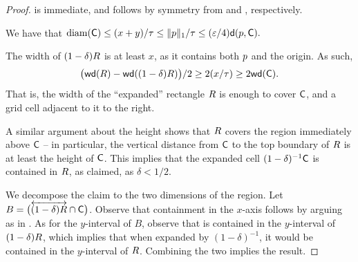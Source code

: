 \documentclass[12pt]{article}%
\begin{document}
\begin{proof}
     is immediate,  and 
    follows by symmetry from  and ,
    respectively.

    \smallskip%
    \noindent%
     We have that
    \begin{math}
        \diameterX{\cell}%
        \leq%
        (x+y) /\gConst%
        \leq%
        \|\pa\|_1 /\gConst \leq %
        (\eps/4) \dsY{\pa}{\cell}.
    \end{math}

    \newcommand{\widthX}[1]{\Mh{\mathsf{wd}}\pth{#1}} \smallskip%
    \smallskip%
    \noindent%
     The width of $(1-\delta)R$ is at least $x$,
    as it contains both $p$ and the origin. As such,
    \begin{equation*}
        \bigl( \widthX{\rect} - \widthX{(1-\delta)\rect} \bigr)/2 \geq
        2(x /\tau) \geq 2 \widthX{\cell}.
    \end{equation*}
    That is, the width of the ``expanded'' rectangle $R$ is enough
    to cover $\mathsf{C}$, and a grid cell adjacent to it to the right.

    A similar argument about the height shows that $R$ covers the
    region immediately above $\mathsf{C}$ -- in particular, the vertical
    distance from $\mathsf{C}$ to the top boundary of $R$ is at least
    the height of $\mathsf{C}$. This implies that the expanded cell
    $(1-\delta)^{-1}\mathsf{C}$ is contained in $R$, as claimed, as
    $\delta < 1/2$.


    \smallskip%
    \noindent%
     We decompose the claim to the two dimensions of the
    region. Let
    $B = \bigl(\overleftrightarrow{ (1-\delta)R} \cap \mathsf{C}
    \bigr)$. Observe that containment in the $x$-axis follows by
    arguing as in . As for the $y$-interval of $B$,
    observe that is contained in the $y$-interval of
    $(1-\delta)R$, which implies that when expanded by
    $(1-\delta)^{-1}$, it would be contained in the $y$-interval of
    $R$. Combining the two implies the result.
\end{proof}
\end{document}
